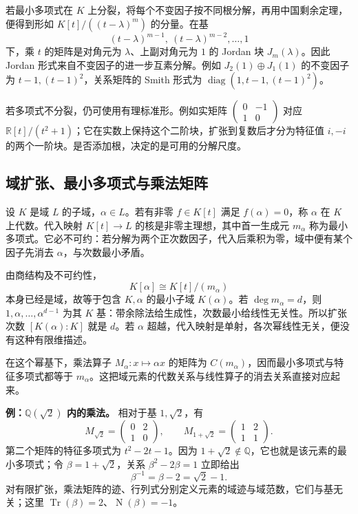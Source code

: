 \documentclass[UTF8,12pt,a4paper,fontset=fandol]{ctexart}
\begin{document}
若最小多项式在 $K$ 上分裂，将每个不变因子按不同根分解，再用中国剩余定理，便得到形如 $K[t]/((t-\lambda)^m)$ 的分量。在基
\[
(t-\lambda)^{m-1},\ (t-\lambda)^{m-2},\ldots,1
\]
下，乘 $t$ 的矩阵是对角元为 $\lambda$、上副对角元为 $1$ 的 Jordan 块 $J_m(\lambda)$。因此 Jordan 形式来自不变因子的进一步互素分解。例如 $J_2(1)\oplus J_1(1)$ 的不变因子为 $t-1,(t-1)^2$，关系矩阵的 Smith 形式为 $\operatorname{diag}(1,t-1,(t-1)^2)$。

若多项式不分裂，仍可使用有理标准形。例如实矩阵 $\begin{pmatrix}0&-1\\1&0\end{pmatrix}$ 对应 $\mathbb R[t]/(t^2+1)$；它在实数上保持这个二阶块，扩张到复数后才分为特征值 $i,-i$ 的两个一阶块。是否添加根，决定的是可用的分解尺度。

\subsection{域扩张、最小多项式与乘法矩阵}

\label{app:algebra-extension}

设 $K$ 是域 $L$ 的子域，$\alpha\in L$。若有非零 $f\in K[t]$ 满足 $f(\alpha)=0$，称 $\alpha$ 在 $K$ 上代数。代入映射 $K[t]\to L$ 的核是非零主理想，其中首一生成元 $m_\alpha$ 称为最小多项式。它必不可约：若分解为两个正次数因子，代入后乘积为零，域中便有某个因子先消去 $\alpha$，与次数最小矛盾。

由商结构及不可约性，
\[
K[\alpha]\cong K[t]/(m_\alpha)
\]
本身已经是域，故等于包含 $K,\alpha$ 的最小子域 $K(\alpha)$。若 $\deg m_\alpha=d$，则 $1,\alpha,\ldots,\alpha^{d-1}$ 为其 $K$ 基：带余除法给生成性，次数最小给线性无关性。所以扩张次数 $[K(\alpha):K]$ 就是 $d$。若 $\alpha$ 超越，代入映射是单射，各次幂线性无关，便没有这种有限维描述。

在这个幂基下，乘法算子 $M_\alpha:x\mapsto\alpha x$ 的矩阵为 $C(m_\alpha)$，因而最小多项式与特征多项式都等于 $m_\alpha$。这把域元素的代数关系与线性算子的消去关系直接对应起来。

\textbf{例：$\mathbb Q(\sqrt2)$ 内的乘法。} 相对于基 $1,\sqrt2$，有
\[
M_{\sqrt2}=\begin{pmatrix}0&2\\1&0\end{pmatrix},
\qquad
M_{1+\sqrt2}=\begin{pmatrix}1&2\\1&1\end{pmatrix}.
\]
第二个矩阵的特征多项式为 $t^2-2t-1$。因为 $1+\sqrt2\notin\mathbb Q$，它也就是该元素的最小多项式；令 $\beta=1+\sqrt2$，关系 $\beta^2-2\beta=1$ 立即给出
\[
\beta^{-1}=\beta-2=\sqrt2-1.
\]
对有限扩张，乘法矩阵的迹、行列式分别定义元素的域迹与域范数，它们与基无关；这里 $\operatorname{Tr}(\beta)=2$、$\operatorname{N}(\beta)=-1$。
\end{document}
